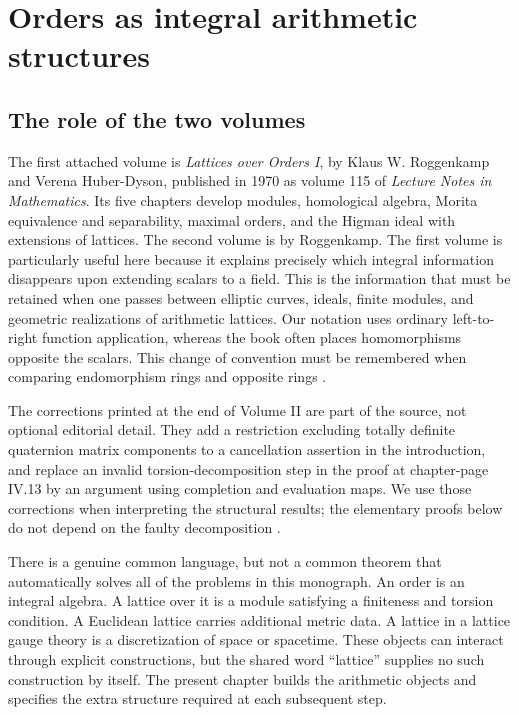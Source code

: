 \chapter{Orders as integral arithmetic structures}
\label{ch:orders}

\section{The role of the two volumes}

The first attached volume is \emph{Lattices over Orders I}, by Klaus W.
Roggenkamp and Verena Huber-Dyson, published in 1970 as volume 115 of
\emph{Lecture Notes in Mathematics}. Its five chapters develop modules,
homological algebra, Morita equivalence and separability, maximal orders,
and the Higman ideal with extensions of lattices. The second volume is
by Roggenkamp. The first volume is particularly useful here because it
explains precisely which integral information disappears upon extending
scalars to a field. This is the information that must be retained when
one passes between elliptic curves, ideals, finite modules, and geometric
realizations of arithmetic lattices. Our notation uses ordinary
left-to-right function application, whereas the book often places
homomorphisms opposite the scalars. This change of convention must be
remembered when comparing endomorphism rings and opposite rings
\cite{RoggenkampHuberDyson1970}.

The corrections printed at the end of Volume II are part of the
source, not optional editorial detail. They add a restriction
excluding totally definite quaternion matrix components to a
cancellation assertion in the introduction, and replace an invalid
torsion-decomposition step in the proof at chapter-page IV.13 by
an argument using completion and evaluation maps. We use those
corrections when interpreting the structural results; the elementary
proofs below do not depend on the faulty decomposition
\cite[Corrections Vol.~I]{v2Roggenkamp1970II}.

There is a genuine common language, but not a common theorem that
automatically solves all of the problems in this monograph. An order is
an integral algebra. A lattice over it is a module satisfying a finiteness
and torsion condition. A Euclidean lattice carries additional metric
data. A lattice in a lattice gauge theory is a discretization of space
or spacetime. These objects can interact through explicit constructions,
but the shared word ``lattice'' supplies no such construction by itself.
The present chapter builds the arithmetic objects and specifies the
extra structure required at each subsequent step.

